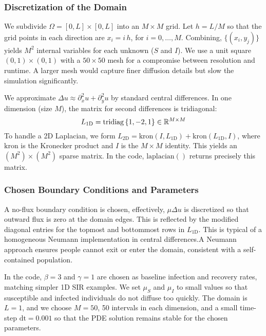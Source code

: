 \subsubsection{Discretization of the Domain}

We subdivide \(\Omega=[0,L]\times [0,L]\) into an \(\!M\times M\) grid. Let \(h=L/M\) so that the grid points in
each direction are \(x_i = i\,h\), for \(i=0,\dots,M\). Combining,
\(\bigl\{(x_i, y_j)\bigr\}\) yields \(M^2\) internal variables for each unknown (\(S\) and \(I\)). We use a unit 
square \((0,1)\times (0,1)\) with a \(50\times 50\) mesh for a compromise between resolution and runtime. A 
larger mesh would capture finer diffusion details but slow the simulation significantly.

We approximate \(\Delta u\approx \partial_x^2u+\partial_y^2u\) by standard central differences. In one dimension 
(size \(M\)), the matrix for second differences is tridiagonal:
\[
  L_{\text{1D}} = \operatorname{tridiag}{\{1,-2,1\}} \in \mathbb{R}^{M\times M}
\]
To handle a 2D Laplacian, we form \(L_{\text{2D}} = \text{kron}(I,L_{\text{1D}}) + \text{kron}(L_{\text{1D}},I)\), 
where \(\text{kron}\) is the Kronecker product and \(I\) is the \(M\times M\) identity. This yields an 
\((M^2)\times(M^2)\) sparse matrix. In the code, \(\mathrm{laplacian()}\) returns precisely this matrix.

\subsubsection{Chosen Boundary Conditions and Parameters}

A no-flux boundary condition is chosen, effectively, \(\mu \Delta u\) is discretized so that outward flux is zero 
at the domain edges. This is reflected by the modified diagonal entries for the topmost and bottommost rows 
in \(L_{\text{1D}}\). This is typical of a homogeneous Neumann implementation in central differences.A Neumann 
approach ensures people cannot exit or enter the domain, consistent with a self-contained population. 


In the code, \(\beta=3\) and \(\gamma=1\) are chosen as baseline infection and recovery rates, matching simpler 
1D SIR examples.  We set \(\mu_S\) and \(\mu_I\) to small values so that susceptible and infected individuals do 
not diffuse too quickly.  The domain is \(L=1\), and we choose \(M=50\), 50 intervals in each dimension, and a 
small time-step \(\text{dt} = 0.001\) so that the PDE solution remains stable for the chosen parameters.


